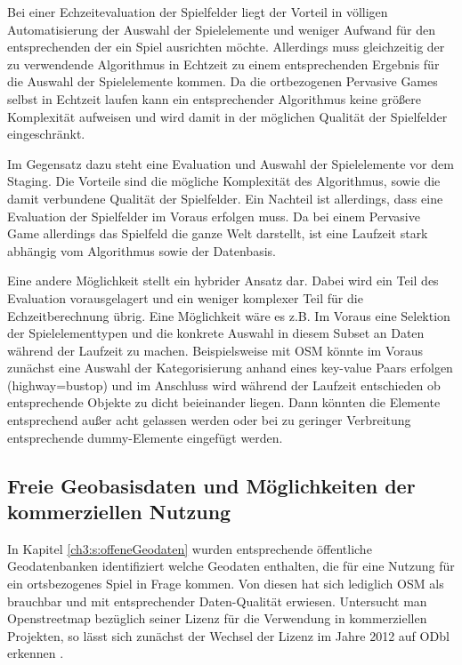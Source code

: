 Bei einer Echzeitevaluation der Spielfelder liegt der Vorteil in völligen Automatisierung der Auswahl der Spielelemente und weniger Aufwand für den entsprechenden der ein Spiel ausrichten möchte. Allerdings muss gleichzeitig der zu verwendende Algorithmus in Echtzeit zu einem entsprechenden Ergebnis für die Auswahl der Spielelemente kommen. Da die ortbezogenen Pervasive Games selbst in Echtzeit laufen kann ein entsprechender Algorithmus keine größere Komplexität aufweisen und wird damit in der möglichen Qualität der Spielfelder eingeschränkt.

Im Gegensatz dazu steht eine Evaluation und Auswahl der Spielelemente vor dem Staging. Die Vorteile sind die mögliche Komplexität des Algorithmus, sowie die damit verbundene Qualität der Spielfelder. Ein Nachteil ist allerdings, dass eine Evaluation der Spielfelder im Voraus erfolgen muss. Da bei einem Pervasive Game allerdings das Spielfeld die ganze Welt darstellt, ist eine Laufzeit stark abhängig vom Algorithmus sowie der Datenbasis.

Eine andere Möglichkeit stellt ein hybrider Ansatz dar. Dabei wird ein Teil des Evaluation vorausgelagert und ein weniger komplexer Teil für die Echzeitberechnung übrig. Eine Möglichkeit wäre es z.B. Im Voraus eine Selektion der Spielelementtypen und die konkrete Auswahl in diesem Subset an Daten während der Laufzeit zu machen. Beispielsweise mit OSM könnte im Voraus zunächst eine Auswahl der Kategorisierung anhand eines key-value Paars erfolgen (highway=bustop) und im Anschluss wird während der Laufzeit entschieden ob entsprechende Objekte zu dicht beieinander liegen. Dann könnten die Elemente entsprechend außer acht gelassen werden oder bei zu geringer Verbreitung entsprechende dummy-Elemente eingefügt werden.

\subsection*{Freie Geobasisdaten und Möglichkeiten der kommerziellen Nutzung}

In Kapitel \ref{ch3:s:offeneGeodaten} wurden entsprechende öffentliche Geodatenbanken identifiziert welche Geodaten enthalten, die für eine Nutzung für ein ortsbezogenes Spiel in Frage kommen. Von diesen hat sich lediglich OSM als brauchbar und mit entsprechender Daten-Qualität erwiesen. Untersucht man Openstreetmap bezüglich seiner Lizenz für die Verwendung in kommerziellen Projekten, so lässt sich zunächst der Wechsel der Lizenz im Jahre 2012 auf ODbl erkennen \cite{Ramthun.2012}.

